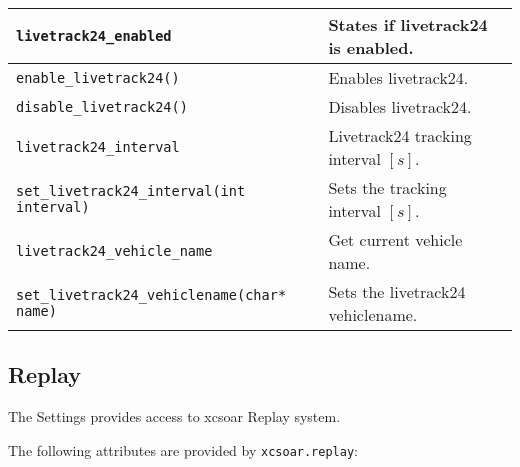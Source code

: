 \begin{maxipage}
\begin{tabularx}{1.9\textwidth}{l|X}
\hline

\verb|livetrack24_enabled| & States if livetrack24 is enabled.\\

\hline

\verb|enable_livetrack24()| & Enables livetrack24.\\

\hline

\verb|disable_livetrack24()| & Disables livetrack24.\\

\hline

\verb|livetrack24_interval| & Livetrack24 tracking interval $[s]$.\\

\hline

\verb|set_livetrack24_interval(int interval)| & Sets the tracking interval $[s]$.\\

\hline

\verb|livetrack24_vehicle_name| & Get current vehicle name.\\

\hline

\verb|set_livetrack24_vehiclename(char* name)| & Sets the livetrack24 vehiclename.\\

\end{tabularx}
\end{maxipage}

\subsection{Replay}\label{sec:lua.replay}

The Settings provides access to xcsoar Replay system.

The following attributes are provided by \verb|xcsoar.replay|:

